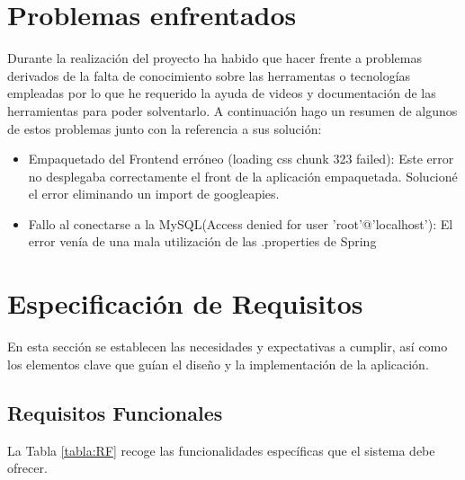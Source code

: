 \section{Problemas enfrentados}
Durante la realización del proyecto ha habido que hacer frente a problemas derivados de la falta de conocimiento sobre las herramentas o tecnologías empleadas
por lo que he requerido la ayuda de videos y documentación de las herramientas para poder solventarlo. A continuación hago un resumen de algunos de estos problemas junto con la referencia a sus solución:
\begin{itemize}
    \item  Empaquetado del Frontend erróneo (loading css chunk 323 failed)\cite{cssChunk}: Este error no desplegaba correctamente el front de la aplicación empaquetada.
     Solucioné el error eliminando un import de googleapies.
    \item  Fallo al conectarse a la MySQL(Access denied for user 'root'@'localhost')\cite{mysql}: El error venía de una mala utilización de las .properties de 
     Spring 
\end{itemize}




\section{Especificación de Requisitos}
En esta sección se establecen las necesidades y expectativas a cumplir, así como los elementos clave que guían el diseño y la implementación de la aplicación.

\subsection{Requisitos Funcionales}
La Tabla \ref{tabla:RF} recoge las funcionalidades específicas que el sistema debe ofrecer.

